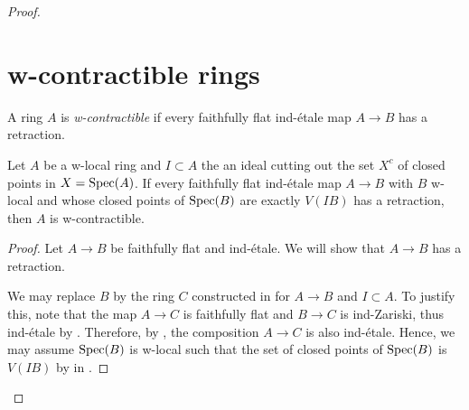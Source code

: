 \begin{proof}
\section{w-contractible rings}

\begin{definition}
A ring \(A\) is \emph{w-contractible} if every faithfully flat ind-étale map \(A \to B\) has a retraction.
  \label{def:w-contractible-ring}
\end{definition}

\begin{lemma}
  \label{thm:w-contractible-if-ind-etale-plus-c-has-retraction}
  Let \(A\) be a w-local ring and $I \subset A$ the an ideal cutting out the set $X^c$ of closed points in $X = \operatorname{Spec} (A)$. If every faithfully flat ind-étale map \(A \to B\) with \(B\) w-local and whose closed points of \(\operatorname{Spec} (B)\) are exactly \(V(IB)\) has a retraction, then \(A\) is w-contractible.
\end{lemma}

\begin{proof}
  Let $A \to B$ be faithfully flat and ind-étale. 
  We will show that $A \to B$ has a retraction.

  We may replace $B$ by the ring $C$ constructed in  for $A \to B$ and $I \subset A$. To justify this, note that the map \(A \to C\) is faithfully flat and \(B \to C\) is ind-Zariski, thus ind-étale by . Therefore, by , the composition \( A \to C \) is also ind-étale. Hence, we may assume $\operatorname{Spec} (B)$ is w-local such that the set of closed points of $\operatorname{Spec} (B)$ is $V(IB)$ by  in .
\end{proof}


\end{proof}
